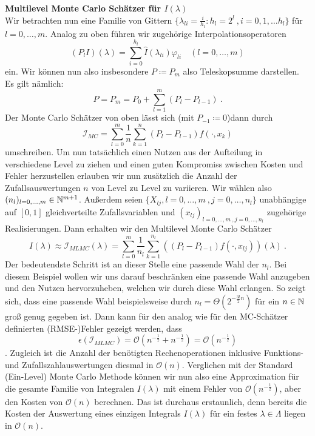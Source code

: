 \begin{Beispiel}
	\textbf{Multilevel Monte Carlo Schätzer für $ I(\lambda) $}\\
	Wir betrachten nun eine Familie von Gittern $ \{ \lambda_{li} = \frac{i}{h_l} : h_l = 2^l \ , i=0,1,\dots h_l \} $ für $ l = 0,\dots,m $.
	Analog zu oben führen wir zugehörige Interpolationsoperatoren 
	\[
	 (P_l I)(\lambda) = \sum_{i=0}^{h_l} \hat{I}(\lambda_{li}) \varphi_{li} \quad (l = 0,\dots,m)
	 \]
	 ein. Wir können nun also insbesondere $ P \coloneqq P_m $ also Teleskopsumme darstellen. Es gilt nämlich:
	 \[
	 	P = P_m = P_0 + \sum_{l=1}^{m} (P_l-P_{l-1}) \ .
	 \]
	 Der Monte Carlo Schätzer von oben lässt sich (mit $ P_{-1} \coloneqq 0 $)dann durch 
	 \[	
	 \mathcal{I}_{MC} = \sum\limits_{l=0}^{m} \frac{1}{n} \sum\limits_{k=1}^{n} (P_l-P_{l-1})f(\cdot,x_k)	
	 \]
	  umschreiben. Um nun tatsächlich einen Nutzen aus der Aufteilung in verschiedene Level zu ziehen und einen guten Kompromiss zwischen Kosten und Fehler herzustellen erlauben wir nun zusätzlich die Anzahl der Zufallsauswertungen $ n $ von Level zu Level zu variieren. 
	  Wir wählen also $ (n_l)_{l=0,\dots,m} \in \mathbb{N}^{m+1}  $.  Außerdem seien $ \{ X_{lj} , l=0,\dots,m \ , j= 0,\dots,n_l\} $ unabhängige auf $ [0,1] $ gleichverteilte Zufallsvariablen und $ (x_{lj})_{l=0,\dots,m \ ,j=0,\dots,n_l} $ zugehörige Realisierungen.
	  Dann erhalten wir den Multilevel Monte Carlo Schätzer 
	  \[
	   I(\lambda) \approx \mathcal{I}_{MLMC}(\lambda) = \sum_{l=0}^{m} \frac{1}{n_l} \sum_{k=1}^{n_l} ((P_l - P_{l-1}) f(\cdot,x_{lj}))(\lambda) \ .
	  \]
	  Der bedeutendste Schritt ist an dieser Stelle eine passende Wahl der $ n_l $. Bei diesem Beispiel wollen wir uns darauf beschränken eine passende Wahl anzugeben und den Nutzen hervorzuheben, welchen wir durch diese Wahl erlangen. So zeigt sich, dass eine passende Wahl beispielsweise durch $ n_l = \Theta(2^{-\frac{3l}{2}n})$ für ein $ n \in \mathbb{N} $ groß genug gegeben ist. 
	  Dann kann für den analog wie für den MC-Schätzer definierten (RMSE-)Fehler gezeigt werden, dass 
	  \[
	  	\epsilon(\mathcal{I}_{MLMC}) = \mathcal{O}(n^{-\frac{1}{2}} + n^{-\frac{1}{2}}) = \mathcal{O}(n^{-\frac{1}{2}})
	  \].
	  Zugleich ist die Anzahl der benötigten Rechenoperationen inklusive Funktions- und Zufallszahlauswertungen diesmal in $ \mathcal{O}(n) $.
	  Verglichen mit der Standard (Ein-Level) Monte Carlo Methode können wir nun also eine Approximation für die gesamte Familie von Integralen $ I(\lambda) $ mit einem Fehler von $ \mathcal{O}(n^{-\frac{1}{2}}) $, aber den Kosten von $ \mathcal{O}(n) $  berechnen. Das ist durchaus erstaunlich, denn bereits die Kosten der Auswertung eines einzigen Integrals $ I(\lambda) $ für ein festes $ \lambda \in \Lambda $ liegen in $ \mathcal{O}(n) $. 
\end{Beispiel}

